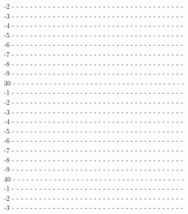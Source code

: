 \documentclass{cmspaper}
\begin{document}
{\begin{flushleft}
-2 - - - - - - - - - - - - - - - - - - - - - - - - - - - - - - - - - - - - - -\\
-3 - - - - - - - - - - - - - - - - - - - - - - - - - - - - - - - - - - - - - -\\
-4 - - - - - - - - - - - - - - - - - - - - - - - - - - - - - - - - - - - - - -\\
-5 - - - - - - - - - - - - - - - - - - - - - - - - - - - - - - - - - - - - - -\\
-6 - - - - - - - - - - - - - - - - - - - - - - - - - - - - - - - - - - - - - -\\
-7 - - - - - - - - - - - - - - - - - - - - - - - - - - - - - - - - - - - - - -\\
-8 - - - - - - - - - - - - - - - - - - - - - - - - - - - - - - - - - - - - - -\\
-9 - - - - - - - - - - - - - - - - - - - - - - - - - - - - - - - - - - - - - -\\
30 - - - - - - - - - - - - - - - - - - - - - - - - - - - - - - - - - - - - - -\\
-1 - - - - - - - - - - - - - - - - - - - - - - - - - - - - - - - - - - - - - -\\
-2 - - - - - - - - - - - - - - - - - - - - - - - - - - - - - - - - - - - - - -\\
-3 - - - - - - - - - - - - - - - - - - - - - - - - - - - - - - - - - - - - - -\\
-4 - - - - - - - - - - - - - - - - - - - - - - - - - - - - - - - - - - - - - -\\
-5 - - - - - - - - - - - - - - - - - - - - - - - - - - - - - - - - - - - - - -\\
-6 - - - - - - - - - - - - - - - - - - - - - - - - - - - - - - - - - - - - - -\\
-7 - - - - - - - - - - - - - - - - - - - - - - - - - - - - - - - - - - - - - -\\
-8 - - - - - - - - - - - - - - - - - - - - - - - - - - - - - - - - - - - - - -\\
-9 - - - - - - - - - - - - - - - - - - - - - - - - - - - - - - - - - - - - - -\\
40 - - - - - - - - - - - - - - - - - - - - - - - - - - - - - - - - - - - - - -\\
-1 - - - - - - - - - - - - - - - - - - - - - - - - - - - - - - - - - - - - - -\\
-2 - - - - - - - - - - - - - - - - - - - - - - - - - - - - - - - - - - - - - -\\
-3 - - - - - - - - - - - - - - - - - - - - - - - - - - - - - - - - - - - - - -\\

\end{flushleft}}
\end{document}
